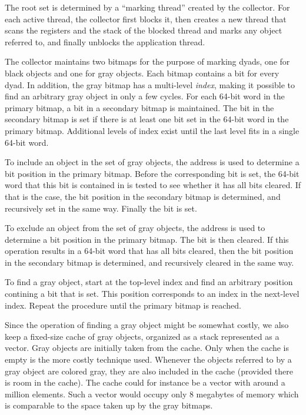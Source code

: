 The root set is determined by a ``marking thread'' created by the
collector.  For each active thread, the collector first blocks it,
then creates a new thread that scans the registers and the stack of
the blocked thread and marks any object referred to, and finally
unblocks the application thread.

The collector maintains two bitmaps for the purpose of marking
dyads, one for black objects and one for gray objects.  Each bitmap
contains a bit for every dyad.  In addition, the gray bitmap has a
multi-level \emph{index}, making it possible to find an arbitrary gray
object in only a few cycles.  For each 64-bit word in the primary
bitmap, a bit in a secondary bitmap is maintained.  The bit in the
secondary bitmap is set if there is at least one bit set in the 64-bit
word in the primary bitmap.  Additional levels of index exist until
the last level fits in a single 64-bit word.

To include an object in the set of gray objects, the address is used
to determine a bit position in the primary bitmap.  Before the
corresponding bit is set, the 64-bit word that this bit is contained
in is tested to see whether it has all bits cleared.  If that is the
case, the bit position in the secondary bitmap is determined, and
recursively set in the same way.  Finally the bit is set.

To exclude an object from the set of gray objects, the address is used
to determine a bit position in the primary bitmap. The bit is then
cleared.  If this operation results in a 64-bit word that has all bits
cleared, then the bit position in the
secondary bitmap is determined, and recursively cleared in the same
way.

To find a gray object, start at the top-level index and find an
arbitrary position contining a bit that is set.  This position
corresponds to an index in the next-level index.  Repeat the procedure
until the primary bitmap is reached.

Since the operation of finding a gray object might be somewhat costly,
we also keep a fixed-size cache of gray objects, organized as a stack
represented as a vector.  Gray objects are initially taken from the
cache.  Only when the cache is empty is the more costly technique
used.  Whenever the objects referred to by a gray object are colored
gray, they are also included in the cache (provided there is room in
the cache).  The cache could for instance be a vector with around a
million elements.  Such a vector would occupy only 8 megabytes of
memory which is comparable to the space taken up by the gray bitmaps.

